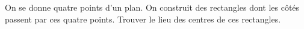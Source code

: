 On se donne quatre points d'un plan. On construit des rectangles dont les côtés passent par ces quatre points. Trouver le lieu des centres de ces rectangles.

